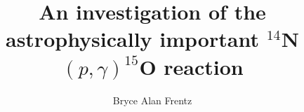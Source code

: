 \documentclass[numrefs,sort&compress,review]{nddiss2e}
\begin{document}
\frontmatter %

\title{An investigation of the astrophysically important $^{14}$N$\left( p,\gamma \right) ^{15}$O reaction}
\author{Bryce Alan Frentz}

\maketitle
%
%

\makecopyright
\end{document}
